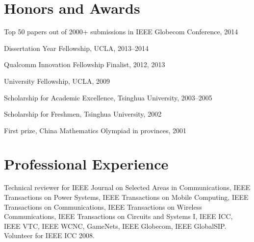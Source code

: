 \documentclass[margin,line]{res}
\begin{document}
\begin{resume}
\section{\sc Honors and Awards}
Top 50 papers out of 2000+ submissions in IEEE Globecom Conference, \hfill 2014

\vspace*{-2.5mm} Dissertation Year Fellowship, UCLA, \hfill 2013--2014

\vspace*{-2.5mm} Qualcomm Innovation Fellowship Finalist, \hfill 2012, 2013

\vspace*{-2.5mm} University Fellowship, UCLA, \hfill 2009

\vspace*{-2.5mm} Scholarship for Academic Excellence, Tsinghua University, \hfill 2003--2005

\vspace*{-2.5mm} Scholarship for Freshmen, Tsinghua University, \hfill 2002

\vspace*{-2.5mm} First prize, China Mathematics Olympiad in
provinces, \hfill 2001




\section{\sc Professional Experience}
Technical reviewer for IEEE Journal on Selected Areas in Communications, IEEE Transactions on Power Systems, IEEE Transactions on Mobile Computing, IEEE Transactions on Communications, IEEE Transactions on Wireless Communications, IEEE Transactions on Circuits and Systems I, IEEE ICC, IEEE VTC, IEEE WCNC, GameNets, IEEE Globecom, IEEE GlobalSIP.\\
Volunteer for IEEE ICC 2008.\\




\end{resume}
\end{document}
